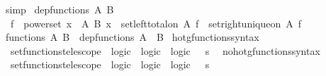 \begin{isabellebody}
\isamarkupfalse%
\ simp%
\endisatagproof
{\isafoldproof}%
%
\isadelimproof
%
\endisadelimproof
%
\isadelimdocument
%
\endisadelimdocument
%
\isatagdocument
%
\isamarkuptrue%
%
\endisatagdocument
{\isafolddocument}%
%
\isadelimdocument
%
\endisadelimdocument
{}\isamarkupfalse%
\ {\isachardoublequoteopen}dep{\isacharunderscore}{\kern0pt}functions\ A\ B\ {\isasymequiv}\isanewline
\ \ {\isacharbraceleft}{\kern0pt}f\ {\isasymin}\ powerset\ {\isacharparenleft}{\kern0pt}{\isasymSum}x\ {\isasymin}\ A{\isachardot}{\kern0pt}\ B\ x{\isacharparenright}{\kern0pt}\ {\isacharbar}{\kern0pt}\ set{\isacharunderscore}{\kern0pt}left{\isacharunderscore}{\kern0pt}total{\isacharunderscore}{\kern0pt}on\ A\ f\ {\isasymand}\ set{\isacharunderscore}{\kern0pt}right{\isacharunderscore}{\kern0pt}unique{\isacharunderscore}{\kern0pt}on\ A\ f{\isacharbraceright}{\kern0pt}{\isachardoublequoteclose}\isanewline
\isanewline
{}\isamarkupfalse%
\ {\isachardoublequoteopen}functions\ A\ B\ {\isasymequiv}\ dep{\isacharunderscore}{\kern0pt}functions\ A\ {\isacharparenleft}{\kern0pt}{\isasymlambda}{\isacharunderscore}{\kern0pt}{\isachardot}{\kern0pt}\ B{\isacharparenright}{\kern0pt}{\isachardoublequoteclose}\isanewline
\isanewline
{}\isamarkupfalse%
\ hotg{\isacharunderscore}{\kern0pt}functions{\isacharunderscore}{\kern0pt}syntax\isanewline
{}\isanewline
{}\isamarkupfalse%
\isanewline
\ \ {\isachardoublequoteopen}{\isacharunderscore}{\kern0pt}set{\isacharunderscore}{\kern0pt}functions{\isacharunderscore}{\kern0pt}telescope{\isachardoublequoteclose}\ {\isacharcolon}{\kern0pt}{\isacharcolon}{\kern0pt}\ {\isachardoublequoteopen}logic\ {\isasymRightarrow}\ logic\ {\isasymRightarrow}\ logic{\isachardoublequoteclose}\ \ {\isacharparenleft}{\kern0pt}\ {\isachardoublequoteopen}{\isasymrightarrow}s{\isachardoublequoteclose}\ {}{}{\isacharparenright}{\kern0pt}\isanewline
{}\isamarkupfalse%
\isanewline
{}\isamarkupfalse%
\ no{\isacharunderscore}{\kern0pt}hotg{\isacharunderscore}{\kern0pt}functions{\isacharunderscore}{\kern0pt}syntax\isanewline
{}\isanewline
{}\isamarkupfalse%
\isanewline
\ \ {\isachardoublequoteopen}{\isacharunderscore}{\kern0pt}set{\isacharunderscore}{\kern0pt}functions{\isacharunderscore}{\kern0pt}telescope{\isachardoublequoteclose}\ {\isacharcolon}{\kern0pt}{\isacharcolon}{\kern0pt}\ {\isachardoublequoteopen}logic\ {\isasymRightarrow}\ logic\ {\isasymRightarrow}\ logic{\isachardoublequoteclose}\ \ {\isacharparenleft}{\kern0pt}\ {\isachardoublequoteopen}{\isasymrightarrow}s{\isachardoublequoteclose}\ {}{}{\isacharparenright}{\kern0pt}\isanewline

\end{isabellebody}
